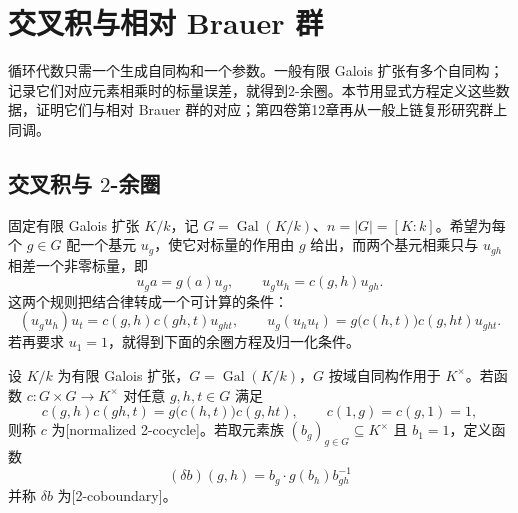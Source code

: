 
\section{交叉积与相对 Brauer 群}
\label{b2:sec:1804}

循环代数只需一个生成自同构和一个参数。一般有限 Galois 扩张有多个自同构；记录它们对应元素相乘时的标量误差，就得到\(2\)-余圈。本节用显式方程定义这些数据，证明它们与相对 Brauer 群的对应；第四卷第12章再从一般上链复形研究群上同调。

%
%

\subsection{\texorpdfstring{交叉积与 \(2\)-余圈}{交叉积与 2-余圈}}
\label{b2:subsec:1804:01}

固定有限 Galois 扩张 \(K/k\)，记 \(G=\operatorname{Gal}(K/k)\)、\(n=|G|=[K:k]\)。希望为每个 \(g\in G\) 配一个基元 \(u_g\)，使它对标量的作用由 \(g\) 给出，而两个基元相乘只与 \(u_{gh}\) 相差一个非零标量，即
\[
	u_g a=g(a)u_g,\qquad u_g u_h=c(g,h)u_{gh}.
\]
这两个规则把结合律转成一个可计算的条件：
\[
	(u_g u_h)u_t=c(g,h)c(gh,t)u_{ght},\qquad u_g(u_h u_t)=g\bigl(c(h,t)\bigr)c(g,ht)u_{ght}.
\]
若再要求 \(u_1=1\)，就得到下面的余圈方程及归一化条件。

\begin{definition}\label{b2:def:normalized-two-cocycle}
	设 \(K/k\) 为有限 Galois 扩张，\(G=\operatorname{Gal}(K/k)\)，\(G\) 按域自同构作用于 \(K^\times\)。若函数 \(c:G\times G\to K^\times\) 对任意 \(g,h,t\in G\) 满足
	\begin{equation}\label{b2:eq:two-cocycle}
		c(g,h)c(gh,t)=g\bigl(c(h,t)\bigr)c(g,ht),\qquad c(1,g)=c(g,1)=1,
	\end{equation}
	则称 \(c\) 为[normalized 2-cocycle]。若取元素族 \((b_g)_{g\in G}\subseteq K^\times\) 且 \(b_1=1\)，定义函数
	\[
		(\delta b)(g,h)=b_g\cdot g(b_h)b_{gh}^{-1}
	\]
	并称 \(\delta b\) 为[2-coboundary]。
\end{definition}

